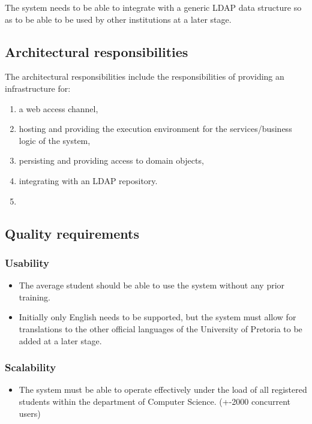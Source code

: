 \documentclass[11pt,a4paper]{article}
\begin{document}
The system needs to be able to integrate with a generic LDAP data structure so as to be able to be used by other institutions at a later stage.

	\subsection{Architectural responsibilities}
	The architectural responsibilities include the responsibilities of providing an infrastructure for:
	\begin{enumerate}
		\item a web access channel,
		\item hosting and providing the execution environment for the services/business logic of the system,
		\item persisting and providing access to domain objects,
		\item integrating with an LDAP repository.
		\item 
	\end{enumerate}
		 
	\subsection{Quality requirements}
		\subsubsection{Usability}
		\begin{itemize}
			\item The average student should be able to use the system without any prior training.
			\item Initially only English needs to be supported, but the system must allow for translations to the other official languages of the University of Pretoria to be added at a later stage.
		\end{itemize}
	
		\subsubsection{Scalability}
		\begin{itemize}
			\item The system must be able to operate effectively under the load of all registered students within the department of Computer Science. (+-2000 concurrent users)
		\end{itemize}
		
\end{document}
